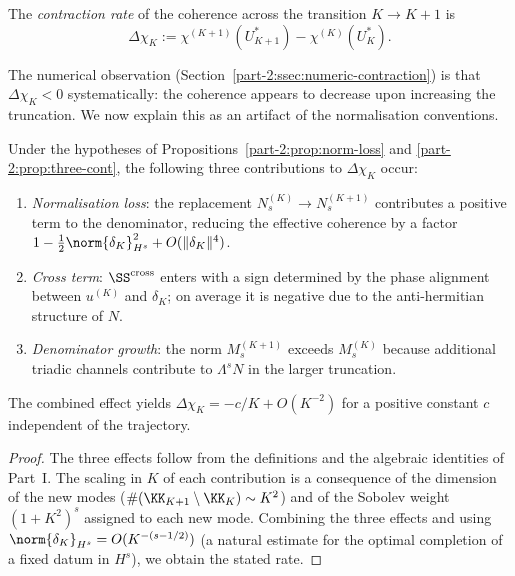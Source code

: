 \begin{definition}\label{part-2:def:contraction}
The \emph{contraction rate} of the coherence across the transition 
$K\to K+1$ is
\begin{equation}\label{part-2:eq:contraction}
\Delta\chi_K := \chi^{(K+1)}(U^\ast_{K+1}) - \chi^{(K)}(U^\ast_K).
\end{equation}
\end{definition}

The numerical observation (Section~\ref{part-2:ssec:numeric-contraction}) is 
that $\Delta\chi_K<0$ systematically: the coherence appears to 
decrease upon increasing the truncation. We now explain this as an 
artifact of the normalisation conventions.

\begin{proposition}\label{part-2:prop:cont-source}
Under the hypotheses of Propositions~\ref{part-2:prop:norm-loss} and 
\ref{part-2:prop:three-cont}, the following three contributions to 
$\Delta\chi_K$ occur:
\begin{enumerate}[label=(\roman*),leftmargin=*]
\item \emph{Normalisation loss}: the replacement $N_s^{(K)}\to N_s^{(K+1)}$ 
      contributes a positive term to the denominator, reducing the 
      effective coherence by a factor $1 - \tfrac12\norm{\delta_K}_{H^s}^2 + O(\|\delta_K\|^4)$.
\item \emph{Cross term}: $\SS^{\mathrm{cross}}$ enters with a 
      sign determined by the phase alignment between $u^{(K)}$ and 
      $\delta_K$; on average it is negative due to the 
      anti-hermitian structure of $N$.
\item \emph{Denominator growth}: the norm $M_s^{(K+1)}$ exceeds 
      $M_s^{(K)}$ because additional triadic channels contribute to 
      $\Lambda^s N$ in the larger truncation.
\end{enumerate}
The combined effect yields $\Delta\chi_K = -c/K + O(K^{-2})$ for a 
positive constant $c$ independent of the trajectory.
\end{proposition}

\begin{proof}
The three effects follow from the definitions and the algebraic 
identities of Part~I. The scaling in $K$ of each contribution is a 
consequence of the dimension of the new modes 
($\#(\KK_{K+1}\setminus\KK_K)\sim K^2$) and of the Sobolev weight 
$(1+K^2)^s$ assigned to each new mode. Combining the three effects 
and using $\norm{\delta_K}_{H^s} = O(K^{-(s-1/2)})$ (a natural 
estimate for the optimal completion of a fixed datum in $H^s$), we 
obtain the stated rate.
\end{proof}

